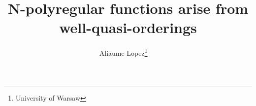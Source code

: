 %

\title{N-polyregular functions arise from well-quasi-orderings}
\author{%
        Aliaume Lopez\thanks{University of Warsaw}%
    ~~\href{mailto:ad.lopez@uw.edu.pl}{\Letter}%
    }


\newcommand{\makeabstract}{
\begin{abstract}
    A fundamental construction in formal language theory is the
    Myhill-Nerode congruence on words, whose finitedness characterizes
    regular language. This construction was generalized to functions
    from \(\Sigma^*\) to \(\mathbb{Z}\) by Colcombet, Douéneau-Tabot,
    and Lopez to characterize the class of so-called
    \(\mathbb{Z}\)-polyregular functions. In this paper, we relax the
    notion of equivalence relation to quasi-ordering in order to study
    the class of functions from \(\Sigma^*\) to \(\mathbb{N}\). The
    analogue of having a finite index is then being a
    well-quasi-ordering. This provides a canonical object to describe
    \(\mathbb{N}\)-polyregular functions, which was lacking prior to
    this work.
\end{abstract}
}
